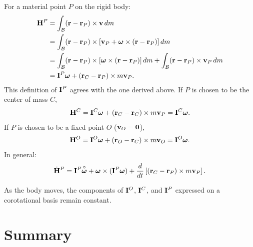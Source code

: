 \documentclass[
  letterpaper,
  DIV=11,
  numbers=noendperiod]{scrreprt}
\newcommand{\leb}{\left[}
\newcommand{\reb}{\right]}
\newcommand{\bomega}{\boldsymbol{\omega}}
\begin{document}
For a material point \(P\) on the rigid body: \begin{align}
    {\bf H}^P &= \int_{\mathcal{B}}({\bf r}-{\bf r}_P)\times{\bf v}\,dm\\
    &= \int_{\mathcal{B}}({\bf r}-{\bf r}_P)\times[{\bf v}_P+\bomega\times({\bf r}-{\bf r}_P)]\,dm\\
    &= \int_{\mathcal{B}}({\bf r}-{\bf r}_P)\times[\bomega\times({\bf r}-{\bf r}_P)]\,dm+\int_{\mathcal{B}}({\bf r}-{\bf r}_P)\times{\bf v}_P\,dm\\
    &= {\bf I}^P\bomega+({\bf r}_C-{\bf r}_P)\times m{\bf v}_P.
\end{align} This definition of \({\bf I}^P\) agrees with the one derived
above. If \(P\) is chosen to be the center of mass \(C\), \begin{align}
    {\bf H}^C = {\bf I}^C\bomega+({\bf r}_C-{\bf r}_C)\times m{\bf v}_P = {\bf I}^C\bomega.
\end{align} If \(P\) is chosen to be a fixed point \(O\)
(\({\bf v}_O={\bf 0}\)), \begin{align}
    {\bf H}^O = {\bf I}^O\bomega+({\bf r}_O-{\bf r}_C)\times m{\bf v}_O = {\bf I}^O\bomega.
\end{align} In general: \begin{align}
    \dot{\bf H}^P = {\bf I}^P\overset{\circ}{\bomega}+\bomega\times({\bf I}^P\bomega)+\frac{d}{dt}\leb({\bf r}_C-{\bf r}_P)\times m{\bf v}_P\reb.
\end{align}

\begin{tcolorbox}[enhanced jigsaw, arc=.35mm, bottomrule=.15mm, bottomtitle=1mm, breakable, colback=white, colbacktitle=quarto-callout-important-color!10!white, colframe=quarto-callout-important-color-frame, coltitle=black, left=2mm, leftrule=.75mm, opacityback=0, opacitybacktitle=0.6, rightrule=.15mm, title=\textcolor{quarto-callout-important-color}{\faExclamation}\hspace{0.5em}{Note!}, titlerule=0mm, toprule=.15mm, toptitle=1mm]

As the body moves, the components of \({\bf I}^O\), \({\bf I}^C\), and
\({\bf I}^P\) expressed on a corotational basis remain constant.

\end{tcolorbox}

\section{Summary}\label{summary-11}
\end{document}
